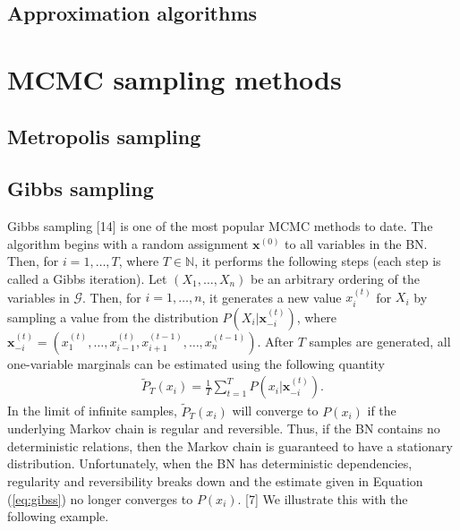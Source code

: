 \documentclass[a4paper, twoside, 11pt]{report}
\theoremstyle{plain}
\theoremstyle{definition}
\theoremstyle{remark}
\newcommand{\G}{{\mathcal G}}
\newcommand{\bfx}{{\mathbf{x}}}
\begin{document}
\subsection{Approximation algorithms}


\section{MCMC sampling methods}



\subsection{Metropolis sampling}


\subsection{Gibbs sampling}
Gibbs sampling [14] is one of the most popular MCMC methods to date. The algorithm begins with a random assignment $\bfx^{(0)}$ to all variables in the BN. Then, for $i = 1, \ldots, T$, where $T \in \mathbb{N}$,  it performs the following steps (each step is called a Gibbs iteration). Let $(X_1, \ldots , X_n)$ be an arbitrary ordering of the variables in $\G$. Then, for $i=1, \ldots, n$, it generates a new value $x_i^{(t)}$ for $X_i$ by sampling a value from the distribution $P(X_i | \bfx_{-i}^{(t)})$, where $\bfx_{-i}^{(t)} = (x_1^{(t)}, \ldots, x_{i-1}^{(t)}, x_{i+1}^{(t-1)}, \ldots, x_{n}^{(t-1)})$. After $T$ samples are generated, all one-variable marginals can be estimated using the following quantity
\begin{align}\label{eq:gibss}
\widetilde{P}_T(x_i) = \frac{1}{T} \sum_{t=1}^T P(x_i | \bfx_{-i}^{(t)} ).
\end{align}
In the limit of infinite samples, $\widetilde{P}_T(x_i)$ will converge to $P(x_i)$ if the underlying Markov chain is regular and reversible. Thus, if the BN contains no deterministic relations, then the Markov chain is guaranteed to have a stationary distribution. Unfortunately, when the BN has deterministic dependencies, regularity and reversibility breaks down and the estimate given in Equation (\ref{eq:gibss}) no longer converges to $P(x_i)$. [7] We illustrate this with the following example.
\end{document}
